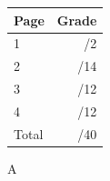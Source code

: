 \documentclass[12pt]{article}
\newcommand{\skipline}{\vspace{12pt}}
\begin{document}
\begin{table}[hbt]
\begin{center}
\begin{tabular}{|l|r|} \hline
Page&Grade\\
\hline \hline
\cline{1-2} 1 & \enspace\enspace\enspace\enspace\enspace\enspace/2\\
\cline{1-2} 2 & \enspace\enspace\enspace\enspace\enspace\enspace/14\\
\cline{1-2} 3 & \enspace\enspace\enspace\enspace\enspace\enspace/12\\
\cline{1-2} 4 & \enspace\enspace\enspace\enspace\enspace\enspace/12\\
\cline{1-2} Total & \enspace\enspace\enspace\enspace\enspace\enspace/40\\
\hline
\end{tabular}

\skipline

\skipline

\skipline

A
\end{center}
\end{table}
\newpage
\end{document}
